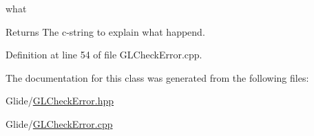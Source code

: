 what 

\begin{DoxyReturn}{Returns}
The c-\/string to explain what happend. 
\end{DoxyReturn}


Definition at line 54 of file G\-L\-Check\-Error.\-cpp.



The documentation for this class was generated from the following files\-:\begin{DoxyCompactItemize}
\item 
Glide/\hyperlink{_g_l_check_error_8hpp}{G\-L\-Check\-Error.\-hpp}\item 
Glide/\hyperlink{_g_l_check_error_8cpp}{G\-L\-Check\-Error.\-cpp}\end{DoxyCompactItemize}
